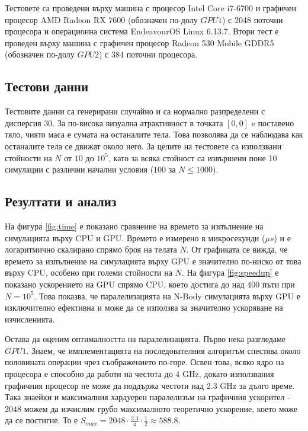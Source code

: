 \documentclass[11pt, a4paper]{article}
\begin{document}
\begin{sloppypar}
Тестовете са проведени върху машина с процесор Intel Core i7-6700 и графичен процесор AMD Radeon RX 7600 (обозначен по-долу $GPU1$) с 2048 поточни процесора и операционна система EndeavourOS Linux 6.13.7. Втори тест е проведен върху машина с графичен процесор Radeon 530 Mobile GDDR5 (обозначен по-долу $GPU2$) с 384 поточни процесора.

\subsection{Тестови данни}

Тестовите данни са генерирани случайно и са нормално разпределени с дисперсия $30$. За по-висока визуална атрактивност в точката $[0,0]$ e поставено тяло, чиято маса е сумата на останалите тела. Това позволява да се наблюдава как останалите тела се движат около него. За целите на тестовете са използвани стойности на $N$ от $10$ до $10^5$, като за всяка стойност са извършени поне 10 симулации с различни начални условия ($100$ за $N \leq 1000$).

\subsection{Резултати и анализ}

На фигура \ref{fig:time} е показано сравнение на времето за изпълнение на симулацията върху CPU и GPU. Времето е измерено в микросекунди ($\mu s$) и е логаритмично скалирано спрямо броя на телата $N$. От графиката се вижда, че времето за изпълнение на симулацията върху GPU е значително по-ниско от това върху CPU, особено при големи стойности на $N$. На фигура \ref{fig:speedup} е показано ускорението на GPU спрямо CPU, което достига до над $400$ пъти при $N = 10^5$. Това показва, че паралелизацията на N-Body симулацията върху GPU е изключително ефективна и може да се използва за значително ускоряване на изчисленията.

Остава да оценим оптималността на паралелизацията. Първо нека разгледаме $GPU1$. Знаем, че имплементацията на последователния алгоритъм спестява около половината операции чрез съображението по-горе. Освен това, всяко ядро на процесора е способно да работи на честота до 4 GHz, докато използвания графичния процесор не може да поддържа честоти над 2.3 GHz за дълго време. Така знаейки и максималния хардуерен паралелизъм на графичния ускорител - $2048$ можем да изчислим грубо максималното теоретично ускорение, което може да се постигне. То е $ S_{max} = 2048 \cdot \frac{2.3}{4} \cdot \frac{1}{2} \approx 588.8$.


\end{sloppypar}
\end{document}
